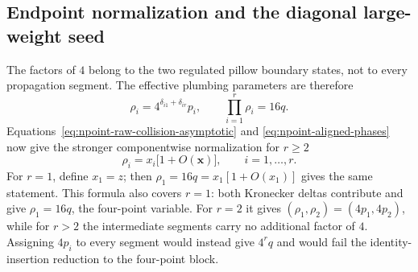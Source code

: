 \documentclass[11pt]{article}
\begin{document}
\subsection{Endpoint normalization and the diagonal large-weight seed}

The factors of $4$ belong to the two regulated pillow boundary states, not
to every propagation segment.  The effective plumbing parameters are
therefore
\begin{equation}
 \boxed{\rho_i=4^{\delta_{i1}+\delta_{ir}}p_i,
 \qquad \prod_{i=1}^{r}\rho_i=16q.}
 \label{eq:npoint-effective-plumbing}
\end{equation}
Equations~\eqref{eq:npoint-raw-collision-asymptotic} and
\eqref{eq:npoint-aligned-phases} now give the stronger componentwise
normalization for $r\geq2$
\begin{equation}
 \boxed{\rho_i=x_i\bigl[1+O(\boldsymbol x)\bigr],
 \qquad i=1,\ldots,r.}
 \label{eq:npoint-rho-ope-alignment}
\end{equation}
For $r=1$, define $x_1=z$; then $\rho_1=16q=x_1[1+O(x_1)]$ gives the
same statement.
This formula also covers $r=1$: both Kronecker deltas contribute and give
$\rho_1=16q$, the four-point variable.  For $r=2$ it gives
$(\rho_1,\rho_2)=(4p_1,4p_2)$, while for $r>2$ the intermediate segments
carry no additional factor of $4$.  Assigning $4p_i$ to every segment
would instead give $4^rq$ and would fail the identity-insertion reduction
to the four-point block.
\end{document}
